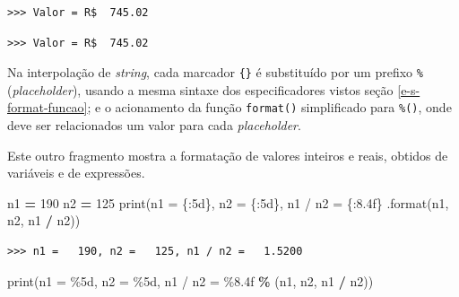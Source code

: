\documentclass[
]{book}
\newenvironment{Shaded}{\begin{snugshade}}{\end{snugshade}}
\newcommand{\BuiltInTok}[1]{#1}
\newcommand{\DecValTok}[1]{\textcolor[rgb]{0.00,0.00,0.81}{#1}}
\newcommand{\NormalTok}[1]{#1}
\newcommand{\OperatorTok}[1]{\textcolor[rgb]{0.81,0.36,0.00}{\textbf{#1}}}
\newcommand{\SpecialCharTok}[1]{\textcolor[rgb]{0.00,0.00,0.00}{#1}}
\newcommand{\StringTok}[1]{\textcolor[rgb]{0.31,0.60,0.02}{#1}}
\begin{document}
\begin{verbatim}
>>> Valor = R$  745.02
\end{verbatim}

\begin{Shaded}
\end{Shaded}

\begin{verbatim}
>>> Valor = R$  745.02
\end{verbatim}

Na interpolação de \emph{string}, cada marcador \texttt{\{\}} é substituído por um prefixo \texttt{\%} (\emph{placeholder}), usando a mesma sintaxe dos especificadores vistos seção \ref{e-s-format-funcao}; e o acionamento da função \texttt{format()} simplificado para \texttt{\%()}, onde deve ser relacionados um valor para cada \emph{placeholder}.

Este outro fragmento mostra a formatação de valores inteiros e reais, obtidos de variáveis e de expressões.

\begin{Shaded}
\begin{Highlighting}[]
\NormalTok{n1 }\OperatorTok{=} \DecValTok{190}
\NormalTok{n2 }\OperatorTok{=} \DecValTok{125}
\BuiltInTok{print}\NormalTok{(}\StringTok{\textquotesingle{}n1 = }\SpecialCharTok{\{:5d\}}\StringTok{, n2 = }\SpecialCharTok{\{:5d\}}\StringTok{, n1 / n2 = }\SpecialCharTok{\{:8.4f\}}\StringTok{\textquotesingle{}}
\NormalTok{    .}\BuiltInTok{format}\NormalTok{(n1, n2, n1 }\OperatorTok{/}\NormalTok{ n2))}
\end{Highlighting}
\end{Shaded}

\begin{verbatim}
>>> n1 =   190, n2 =   125, n1 / n2 =   1.5200
\end{verbatim}

\begin{Shaded}
\begin{Highlighting}[]
\BuiltInTok{print}\NormalTok{(}\StringTok{\textquotesingle{}n1 = }\SpecialCharTok{\%5d}\StringTok{, n2 = }\SpecialCharTok{\%5d}\StringTok{, n1 / n2 = }\SpecialCharTok{\%8.4f}\StringTok{\textquotesingle{}} 
    \OperatorTok{\%}\NormalTok{ (n1, n2, n1 }\OperatorTok{/}\NormalTok{ n2))}
\end{Highlighting}
\end{Shaded}
\end{document}
